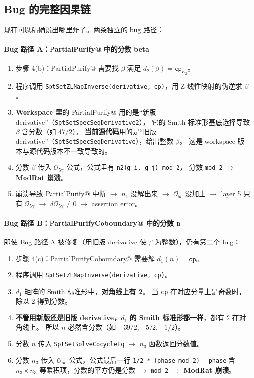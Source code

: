 \documentclass[a4paper,fontset=ubuntu,12pt]{ctexart}
\begin{document}
\subsection{Bug 的完整因果链}
\label{sec:bug-chain}

现在可以精确说出哪里炸了。两条独立的 bug 路径：

\paragraph{Bug 路径 A：PartialPurify@ 中的分数 beta}
\begin{enumerate}
\item 步骤 4(b)：PartialPurify@ 需要找 $\beta$ 满足 $d_2(\beta) = \texttt{cp}_{E_2}$。
\item 程序调用 \texttt{SptSetZLMapInverse(derivative, cp)}，用 Z-线性映射的伪逆求 $\beta$。
\item \textbf{Workspace 里}的 PartialPurify@ 用的是``新版 derivative''（\texttt{SptSetSpecSeqDerivative2}），
      它的 Smith 标准形基底选择导致 $\beta$ 含分数（如 $47/2$）。
      \textbf{当前源代码}用的是``旧版 derivative''（\texttt{SptSetSpecSeqDerivative}），给出整数 $\beta$。
      这是 workspace 版本与源代码版本不一致导致的。
\item 分数 $\beta$ 传入 $\mathcal{O}_{5\gamma}$ 公式，公式里有 \texttt{n2(g\_i, g\_j) mod 2}，
      分数 \texttt{mod 2} $\to$ \textbf{ModRat 崩溃}。
\item 崩溃导致 PartialPurify@ 中断 $\to$ $n_3$ 没解出来 $\to$ $\mathcal{O}_{5c}$ 没加上 $\to$
      layer 5 只有 $\mathcal{O}_{5\gamma}$ $\to$ $d\mathcal{O}_{5\gamma} \neq 0$ $\to$ assertion error。
\end{enumerate}

\paragraph{Bug 路径 B：PartialPurifyCoboundary@ 中的分数 n}
即使 Bug 路径 A 被修复（用旧版 derivative 使 $\beta$ 为整数），仍有第二个 bug：
\begin{enumerate}
\item 步骤 4(c)：PartialPurifyCoboundary@ 需要解 $d_1(n) = \texttt{cp}$。
\item 程序调用 \texttt{SptSetZLMapInverse(derivative, cp)}。
\item $d_1$ 矩阵的 Smith 标准形中，\textbf{对角线上有 2}。
      当 \texttt{cp} 在对应分量上是奇数时，除以 2 得到分数。
\item \textbf{不管用新版还是旧版 derivative，$d_1$ 的 Smith 标准形都一样}，都有 2 在对角线上。
      所以 $n$ 必然含分数（如 $-39/2, -5/2, -1/2$）。
\item 分数 $n$ 传入 \texttt{SptSetSolveCocycleEq} $\to$ $n_3$ 函数返回分数值。
\item 分数 $n_3$ 传入 $\mathcal{O}_{5c}$ 公式，公式最后一行 \texttt{1/2 * (phase mod 2)}：
      \texttt{phase} 含 $n_3 \times n_3$ 等乘积项，分数的平方仍是分数 $\to$ \texttt{mod 2} $\to$ \textbf{ModRat 崩溃}。
\end{enumerate}
\end{document}
